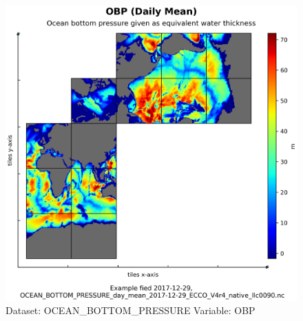 \begin{figure}[H]
\centering
\includegraphics[scale=0.55]{../images/plots/native_plots/Ocean_Bottom_Pressure/OBP.png}
\caption{Dataset: OCEAN\_BOTTOM\_PRESSURE Variable: OBP}
\label{tab:table-OCEAN_BOTTOM_PRESSURE_OBP-Plot}
\end{figure}
\pagebreak
